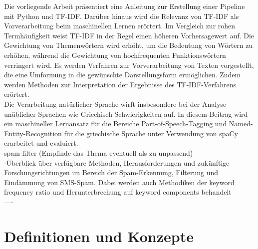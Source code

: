 Die vorliegende Arbeit präsentiert eine Anleitung zur Erstellung einer Pipeline mit Python und TF-IDF. Darüber hinaus wird die Relevanz von TF-IDF als Vorverarbeitung beim maschinellen Lernen erörtert. Im Vergleich zur rohen Termhäufigkeit weist TF-IDF in der Regel einen höheren Vorhersagewert auf. Die Gewichtung von Themenwörtern wird erhöht, um die Bedeutung von Wörtern zu erhöhen, während die Gewichtung von hochfrequenten Funktionswörtern verringert wird. Es werden Verfahren zur Vorverarbeitung von Texten vorgestellt, die eine Umformung in die gewünschte Darstellungsform ermöglichen. Zudem werden Methoden zur Interpretation der Ergebnisse des TF-IDF-Verfahrens erörtert.\cite{lavin2019analyzing}\\

Die Verarbeitung natürlicher Sprache wirft insbesondere bei der Analyse unüblicher Sprachen wie Griechisch Schwierigkeiten auf. In diesem Beitrag wird ein maschineller Lernansatz für die Bereiche Part-of-Speech-Tagging und Named-Entity-Recognition für die griechische Sprache unter Verwendung von spaCy erarbeitet und evaluiert. \cite{partalidou2019design}\\

spam-filter (Empfinde das Thema eventuell als zu unpassend)\\
-Überblick über verfügbare Methoden, Herausforderungen und zukünftige Forschungsrichtungen im Bereich der Spam-Erkennung, Filterung und Eindämmung von SMS-Spam. Dabei werden auch Methodiken der keyword frequency ratio und Herunterbrechung auf keyword components behandelt \cite{shafi2017review}\\

----


\section{Definitionen und Konzepte}
\label{sec:definitionen-konzepte}
